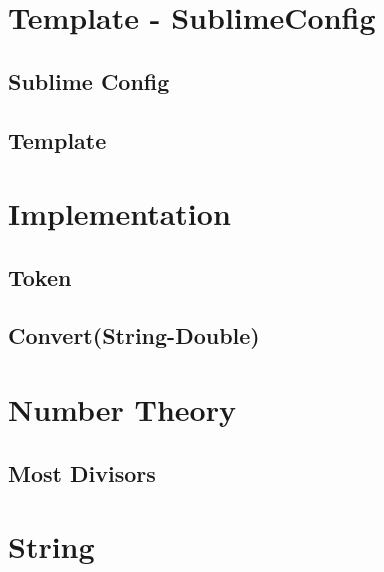 \hrulefill
\section{Template - SublimeConfig}
\subsection{Sublime Config}
\raggedbottom
\subsection{Template}
\raggedbottom
\hrulefill
\section{Implementation}
\subsection{Token}
\raggedbottom
\subsection{Convert(String-Double)}
\raggedbottom
\hrulefill


\section{Number Theory}
\subsection{Most Divisors}
\raggedbottom
\hrulefill

\section{String}
